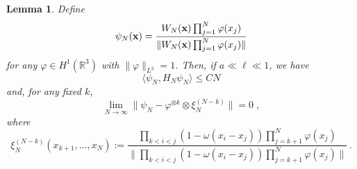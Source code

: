 \documentclass[11pt]{article}
\newtheorem{lemma}[theorem]{Lemma}
\newcommand{\bx}{{\bf x}}
\newcommand{\ph}{\varphi}
\newcommand{\bR}{{\mathbb R}}
\begin{document}
\begin{lemma}\label{lm:W}
Define \[ \psi_N (\bx) = \frac{W_N (\bx) \prod_{j=1}^N \ph (x_j)}{\|
W_N(\bx)\prod_{j=1}^N \ph (x_j)\|} \]  for any $\ph \in H^1 (\bR^3)$
with $\| \ph \|_{L^2} =1$. Then, if $a \ll \ell \ll 1$, we have
\begin{equation}\label{eq:en} \langle \psi_N, H_N \psi_N \rangle \leq C N
\end{equation}
and, for any fixed $k$,
 \begin{equation}\label{eq:fa}
\lim_{N\to\infty}\| \psi_N - \ph^{\otimes k}
\otimes \xi^{(N-k)}_N \| = 0  \; ,\end{equation}
where
\[ \xi^{(N-k)}_N (x_{k+1}, \dots , x_N) := \frac{\prod_{k<i<j} (1-\omega (x_i -x_j)) \prod_{j=k+1}^N
\ph (x_j)}{\|\prod_{k<i<j} (1-\omega (x_i -x_j)) \prod_{j=k+1}^N \ph
(x_j)\|} \,. \]
\end{lemma}
\end{document}
